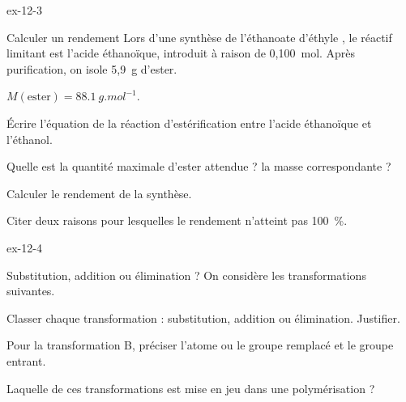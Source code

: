\begin{blocLivre}{ex-12-3}
\begin{exercice}[1]{Calculer un rendement}
Lors d'une synthèse de l'éthanoate d'éthyle , le réactif limitant est l'acide éthanoïque, introduit à
raison de 0,100~mol. Après purification, on isole 5,9~g d'ester.
\begin{donnees}
$M(\text{ester})=\qty{88,1}{g.mol^{-1}}$.
\end{donnees}
\begin{questions}
\item Écrire l'équation de la réaction d'estérification entre l'acide éthanoïque et l'éthanol.
\item Quelle est la quantité maximale d'ester attendue ? la masse correspondante ?
\item Calculer le rendement de la synthèse.
\item Citer deux raisons pour lesquelles le rendement n'atteint pas 100~\%.
\end{questions}
\end{exercice}
\end{blocLivre}
\begin{blocLivre}{ex-12-4}
\begin{exercice}[1]{Substitution, addition ou élimination ?}
On considère les transformations suivantes.
\begin{questions}[label=\otLabel{\Alph*.},leftmargin=1.9em,itemsep=0pt,parsep=0.15em]
\item {}
\item {}
\item {}
\item {}
\end{questions}
\begin{questions}
\item Classer chaque transformation : substitution, addition ou élimination. Justifier.
\item Pour la transformation B, préciser l'atome ou le groupe remplacé et le groupe entrant.
\item Laquelle de ces transformations est mise en jeu dans une polymérisation ?
\end{questions}
\end{exercice}
\end{blocLivre}
